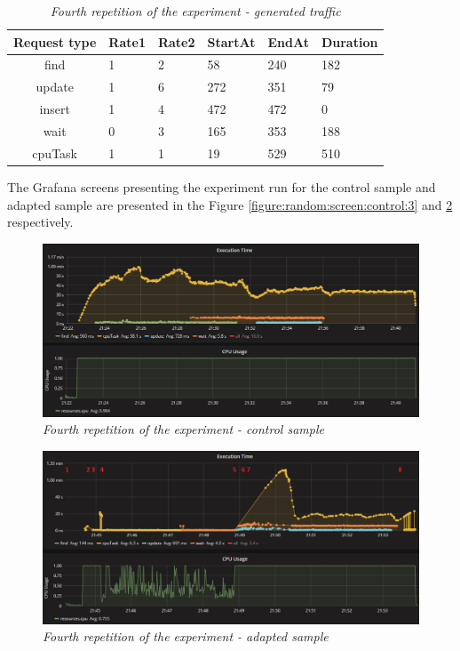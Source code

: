 \documentclass[12pt,a4paper]{article}
\begin{document}
\begin{table}[ht]
\begin{center}
\begin{tabular}{c|C{2cm}|C{2cm}|C{2cm}|C{2cm}|C{2cm}}
\textbf{Request type} & \textbf{Rate1} & \textbf{Rate2} & \textbf{StartAt} & \textbf{EndAt} & \textbf{Duration}\\\hline
find	&1	&2	&58	    &240	&182\\ \hline
update	&1	&6	&272	&351	&79\\ \hline
insert	&1	&4	&472	&472	&0\\ \hline
wait	&0	&3	&165	&353	&188\\ \hline
cpuTask	&1	&1	&19	    &529	&510
\end{tabular}
\end{center}
\caption{\textit{Fourth repetition of the experiment - generated traffic}} \label{table:random:traffic:4}
\end{table}

The Grafana screens presenting the experiment run for the control sample and adapted sample are presented in the Figure \ref{figure:random:screen:control:3} and \ref{figure:random:screen:adapted:4} respectively. 

\begin{figure}[!htb]
\centering
\includegraphics[width=1\textwidth]{4-ctrl}
\caption{\textit{Fourth repetition of the experiment - control sample}} \label{figure:random:screen:control:4}
\end{figure}

\begin{figure}[!htb]
\centering
\includegraphics[width=1\textwidth]{4-adap}
\caption{\textit{Fourth repetition of the experiment - adapted sample}} \label{figure:random:screen:adapted:4}
\end{figure}
\end{document}
